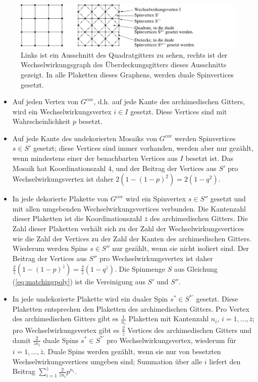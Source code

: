 \begin{figure}[htbp]
  \centering
  \includegraphics{./Schranken-figs/decratedcov}
  \caption{Links ist ein Ausschnitt des Quadratgitters zu sehen, rechts ist der Wechselwirkungsgraph des \"Uberdeckungsgitters dieses Ausschnitts gezeigt. In alle Plaketten dieses Graphens, werden duale Spinvertices gesetzt.}
  \label{fig:decoratedcov}
\end{figure}
\begin{itemize}
\item Auf jeden Vertex von $G^{cov}$, d.h. auf jede Kante des archimedischen Gitters, wird ein Wechselwirkungsvertex $i\in I$ gesetzt. Diese Vertices sind mit Wahrscheinlichkeit $p$ besetzt.
\item Auf jede Kante des undekorierten Mosaiks von $G^{cov}$ werden Spinvertices $s \in S'$ gesetzt; diese Vertices sind immer vorhanden, werden aber nur gez\"ahlt, wenn mindestens einer der benachbarten Vertices aus $I$ besetzt ist. Das Mosaik hat Koordinationszahl $4$, und der Beitrag der Vertices aus $S'$ pro Wechselwirkungsvertex ist daher $2(1-(1-p)^2)=2(1-q^2)$.
\item In jede dekorierte Plakette von $G^{cov}$ wird ein Spinvertex $s\in S''$ gesetzt und mit allen umgebenden Wechselwirkungsvertices verbunden. Die Kantenzahl dieser Plaketten ist die Koordinationszahl $\bar{z}$ des archimedischen Gitters. Die Zahl dieser Plaketten verh\"alt sich zu der Zahl der Wechselwirkungsvertices wie die Zahl der Vertices zu der Zahl der Kanten des archimedischen Gitters. Wiederum werden Spins $s\in S''$ nur gez\"ahlt, wenn sie nicht isoliert sind. Der Beitrag der Vertices aus $S''$ pro Wechselwirkungsvertex ist daher $\frac{2}{\bar{z}}(1-(1-p)^{\bar{z}})=\frac{2}{\bar{z}}(1-q^{\bar{z}})$. Die Spinmenge $S$ aus Gleichung (\ref{eq:matchingpoly}) ist die Vereinigung aus $S'$ und $S''$.
\item In jede undekorierte Plakette wird ein dualer Spin $s^*\in S^{*'}$ gesetzt. Diese Plaketten entsprechen den Plaketten des archimedischen Gitters. Pro Vertex des archimedischen Gitters gibt es $\frac{1}{n_i}$ Plaketten mit Kantenzahl $n_i$, $i=1,\ldots,\bar{z}$; pro Wechselwirkungsvertex gibt es $\frac{2}{\bar{z}}$ Vertices des archimedischen Gitters und damit $\frac{2}{\bar{z}n_i}$ duale Spins $s^*\in S^{*'}$ pro Wechselwirkungsvertex, wiederum f\"ur $i=1,\ldots,\bar{z}$. Duale Spins werden gez\"ahlt, wenn sie nur von besetzten Wechselwirkungsvertices umgeben sind; Summation \"uber alle $i$ liefert den Beitrag $\sum_{i=1}^{\bar{z}}\frac{2}{\bar{z}n_i}p^{n_i}$.

\end{itemize}
